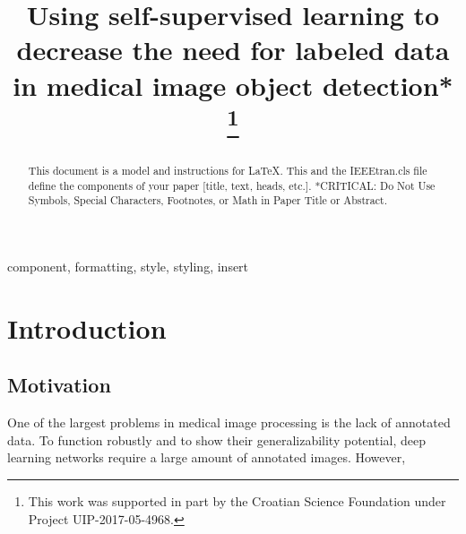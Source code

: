 \documentclass[conference]{IEEEtran}
\begin{document}
\title{Using self-supervised learning to decrease the need for labeled data in medical image object detection*\\
\thanks{This work was supported in part by the Croatian Science Foundation under Project UIP-2017-05-4968.}
}

\author{ 
}

\maketitle

\begin{abstract}
This document is a model and instructions for \LaTeX.
This and the IEEEtran.cls file define the components of your paper [title, text, heads, etc.]. *CRITICAL: Do Not Use Symbols, Special Characters, Footnotes, 
or Math in Paper Title or Abstract.
\end{abstract}

\begin{IEEEkeywords}
component, formatting, style, styling, insert
\end{IEEEkeywords}

\section{Introduction}

\subsection{Motivation}

One of the largest problems in medical image processing is the lack of annotated data. To function 
robustly and to show their generalizability potential, deep learning networks require a large 
amount of annotated images. However, 

\end{document}
